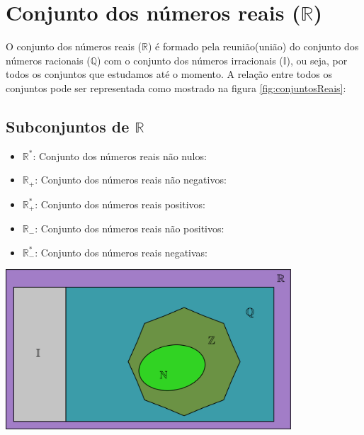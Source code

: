 \documentclass[10pt]{article}
\begin{document}
\section*{Conjunto dos números reais (\( \mathbb{R} \))}
O conjunto dos números reais (\( \mathbb{R} \)) é formado pela reunião(união) do conjunto dos números racionais (\( \mathbb{Q}\)) com o conjunto dos números irracionais (\( \mathbb{I}\)), ou seja, por todos os conjuntos que estudamos até o momento. A relação entre todos os conjuntos pode ser representada como mostrado na figura \ref{fig:conjuntosReais}:
\begin{multicols}{2}
\subsection*{Subconjuntos de \(\mathbb{R}\)}
\begin{itemize}
        \item \( \mathbb{R}^* \): Conjunto dos números reais não nulos:
        \item \( \mathbb{R}_+ \): Conjunto dos números reais não negativos:
        \item \( \mathbb{R}^*_+ \): Conjunto dos números reais positivos:
        \item  \( \mathbb{R}_- \): Conjunto dos números reais não positivos:
        \item  \( \mathbb{R}^*_- \): Conjunto dos números reais negativas:
    \end{itemize}
\columnbreak
\bigskip
\noindent
    \begin{minipage}{\linewidth}
        \centering 
        \includegraphics[width=0.8\textwidth]{imgs/conjuntosNumerico/conjuntosReais.pdf}
        \label{fig:conjuntosReais} 
    \end{minipage}%
\end{multicols} 
\newpage
\end{document}

